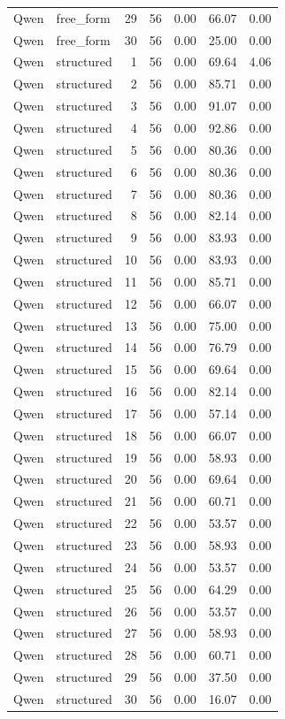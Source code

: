\begin{longtable}{llrrrrr}
Qwen & free\_form & 29 & 56 & 0.00 & 66.07 & 0.00 \\
Qwen & free\_form & 30 & 56 & 0.00 & 25.00 & 0.00 \\
Qwen & structured & 1 & 56 & 0.00 & 69.64 & 4.06 \\
Qwen & structured & 2 & 56 & 0.00 & 85.71 & 0.00 \\
Qwen & structured & 3 & 56 & 0.00 & 91.07 & 0.00 \\
Qwen & structured & 4 & 56 & 0.00 & 92.86 & 0.00 \\
Qwen & structured & 5 & 56 & 0.00 & 80.36 & 0.00 \\
Qwen & structured & 6 & 56 & 0.00 & 80.36 & 0.00 \\
Qwen & structured & 7 & 56 & 0.00 & 80.36 & 0.00 \\
Qwen & structured & 8 & 56 & 0.00 & 82.14 & 0.00 \\
Qwen & structured & 9 & 56 & 0.00 & 83.93 & 0.00 \\
Qwen & structured & 10 & 56 & 0.00 & 83.93 & 0.00 \\
Qwen & structured & 11 & 56 & 0.00 & 85.71 & 0.00 \\
Qwen & structured & 12 & 56 & 0.00 & 66.07 & 0.00 \\
Qwen & structured & 13 & 56 & 0.00 & 75.00 & 0.00 \\
Qwen & structured & 14 & 56 & 0.00 & 76.79 & 0.00 \\
Qwen & structured & 15 & 56 & 0.00 & 69.64 & 0.00 \\
Qwen & structured & 16 & 56 & 0.00 & 82.14 & 0.00 \\
Qwen & structured & 17 & 56 & 0.00 & 57.14 & 0.00 \\
Qwen & structured & 18 & 56 & 0.00 & 66.07 & 0.00 \\
Qwen & structured & 19 & 56 & 0.00 & 58.93 & 0.00 \\
Qwen & structured & 20 & 56 & 0.00 & 69.64 & 0.00 \\
Qwen & structured & 21 & 56 & 0.00 & 60.71 & 0.00 \\
Qwen & structured & 22 & 56 & 0.00 & 53.57 & 0.00 \\
Qwen & structured & 23 & 56 & 0.00 & 58.93 & 0.00 \\
Qwen & structured & 24 & 56 & 0.00 & 53.57 & 0.00 \\
Qwen & structured & 25 & 56 & 0.00 & 64.29 & 0.00 \\
Qwen & structured & 26 & 56 & 0.00 & 53.57 & 0.00 \\
Qwen & structured & 27 & 56 & 0.00 & 58.93 & 0.00 \\
Qwen & structured & 28 & 56 & 0.00 & 60.71 & 0.00 \\
Qwen & structured & 29 & 56 & 0.00 & 37.50 & 0.00 \\
Qwen & structured & 30 & 56 & 0.00 & 16.07 & 0.00 \\
\end{longtable}
